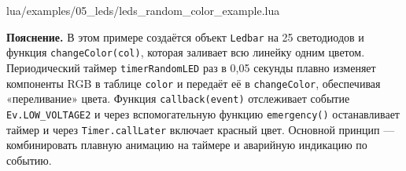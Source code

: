 \begin{codefile}{lua/examples/05_leds/leds_random_color_example.lua}
\end{codefile}

\textbf{Пояснение.} В этом примере создаётся объект \verb|Ledbar| на 25 светодиодов и функция \verb|changeColor(col)|, которая заливает всю линейку одним цветом. Периодический таймер \verb|timerRandomLED| раз в 0{,}05 секунды плавно изменяет компоненты RGB в таблице \verb|color| и передаёт её в \verb|changeColor|, обеспечивая «переливание» цвета. Функция \verb|callback(event)| отслеживает событие \verb|Ev.LOW_VOLTAGE2| и через вспомогательную функцию \verb|emergency()| останавливает таймер и через \verb|Timer.callLater| включает красный цвет. Основной принцип — комбинировать плавную анимацию на таймере и аварийную индикацию по событию.
